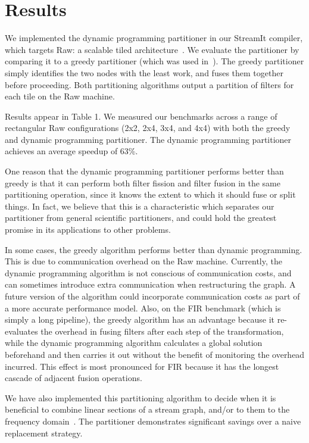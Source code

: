 \section{Results}

We implemented the dynamic programming partitioner in our StreamIt
compiler, which targets Raw: a scalable tiled
architecture~\cite{raw-micro}. We evaluate the partitioner by
comparing it to a greedy partitioner (which was used
in~\cite{streamit-asplos}). The greedy partitioner simply identifies the
two nodes with the least work, and fuses them together before
proceeding. Both partitioning algorithms output a partition of filters
for each tile on the Raw machine.

Results appear in Table 1. We measured our benchmarks across a range
of rectangular Raw configurations (2x2, 2x4, 3x4, and 4x4) with both
the greedy and dynamic programming partitioner. The dynamic
programming partitioner achieves an average speedup of 63\%.

One reason that the dynamic programming partitioner performs better
than greedy is that it can perform both filter fission and filter
fusion in the same partitioning operation, since it knows the extent
to which it should fuse or split things. In fact, we believe that this
is a characteristic which separates our partitioner from general
scientific partitioners, and could hold the greatest promise in its
applications to other problems.

In some cases, the greedy algorithm performs better than dynamic
programming. This is due to communication overhead on the Raw
machine. Currently, the dynamic programming algorithm is not conscious
of communication costs, and can sometimes introduce extra
communication when restructuring the graph.  A future version of the
algorithm could incorporate communication costs as part of a more
accurate performance model. Also, on the FIR benchmark (which is
simply a long pipeline), the greedy algorithm has an advantage because
it re-evaluates the overhead in fusing filters after each step of the
transformation, while the dynamic programming algorithm calculates a
global solution beforehand and then carries it out without the benefit
of monitoring the overhead incurred. This effect is most pronounced
for FIR because it has the longest cascade of adjacent fusion
operations.

We have also implemented this partitioning algorithm to decide when it
is beneficial to combine linear sections of a stream graph, and/or to
them to the frequency domain~\cite{lamb03}. The partitioner
demonstrates significant savings over a naive replacement strategy.
